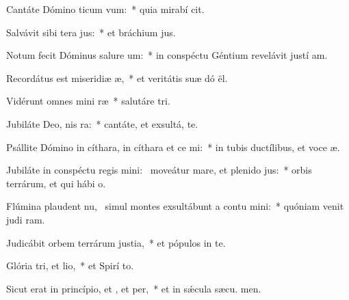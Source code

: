 \item Cantáte Dómino ticum vum:~* quia mirabí cit.
\item Salvávit sibi tera jus:~* et bráchium  jus.
\item Notum fecit Dóminus salure um:~* in conspéctu Géntium revelávit justí am.
\item Recordátus est miseridiæ æ,~* et veritátis suæ dó ël.
\item Vidérunt omnes mini ræ~* salutáre  tri.
\item Jubiláte Deo, nis ra:~* cantáte, et exsultá,  te.
\item Psállite Dómino in cíthara, in cíthara et ce mi:~* in tubis ductílibus, et voce  æ.
\item Jubiláte in conspéctu regis mini:~\pscross{} moveátur mare, et plenido jus:~* orbis terrárum, et qui hábi  o.
\item Flúmina plaudent nu,~\pscross{} simul montes exsultábunt a contu mini:~* quóniam venit judi ram.
\item Judicábit orbem terrárum  justia,~* et pópulos in te.
\item Glória tri, et lio,~* et Spirí to.
\item Sicut erat in princípio, et , et per,~* et in sǽcula sæcu. men.
